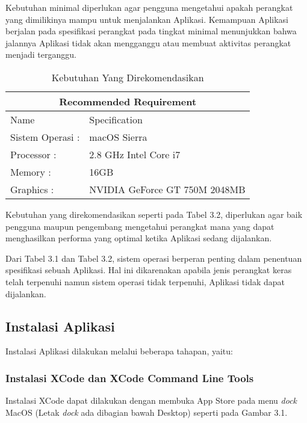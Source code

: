 \documentclass[pi.tex]{subfile}
\begin{document}
\hspace{5pt}Kebutuhan minimal diperlukan agar pengguna mengetahui apakah perangkat yang dimilikinya mampu untuk menjalankan Aplikasi. Kemampuan Aplikasi berjalan pada spesifikasi perangkat pada tingkat minimal menunjukkan bahwa jalannya Aplikasi tidak akan mengganggu atau membuat aktivitas perangkat menjadi terganggu.

\begin{table}[h]
  \centering
\begin{tabular}{ |p{3cm}||p{6cm}|}
  \hline
  \multicolumn{2}{|c|}{Recommended Requirement} 
  \\ \hline
  Name & Specification \\
  \hline
  Sistem Operasi : & macOS Sierra \\
  Processor : & 2.8 GHz Intel Core i7 \\
  Memory : & 16GB \\
  Graphics : & NVIDIA GeForce GT 750M 2048MB \\
  \hline
  
\end{tabular}

\caption{Kebutuhan Yang Direkomendasikan}
\end{table}

\hspace{5pt}Kebutuhan yang direkomendasikan seperti pada Tabel 3.2, diperlukan agar baik pengguna maupun pengembang mengetahui perangkat mana yang dapat menghasilkan performa yang optimal ketika Aplikasi sedang dijalankan.

\hspace{5pt}Dari Tabel 3.1 dan Tabel 3.2, sistem operasi berperan penting dalam penentuan spesifikasi sebuah Aplikasi. Hal ini dikarenakan apabila jenis perangkat keras telah terpenuhi namun sistem operasi tidak terpenuhi, Aplikasi tidak dapat dijalankan.

\subsection{Instalasi Aplikasi}
\hspace{5pt}Instalasi Aplikasi dilakukan melalui beberapa tahapan, yaitu:
\subsubsection{Instalasi XCode dan XCode Command Line Tools}\hspace{10pt}
\hspace{10pt}Instalasi XCode dapat dilakukan dengan membuka App Store pada menu \emph{dock} MacOS (Letak \emph{dock} ada dibagian bawah Desktop) seperti pada Gambar 3.1.
\end{document}
